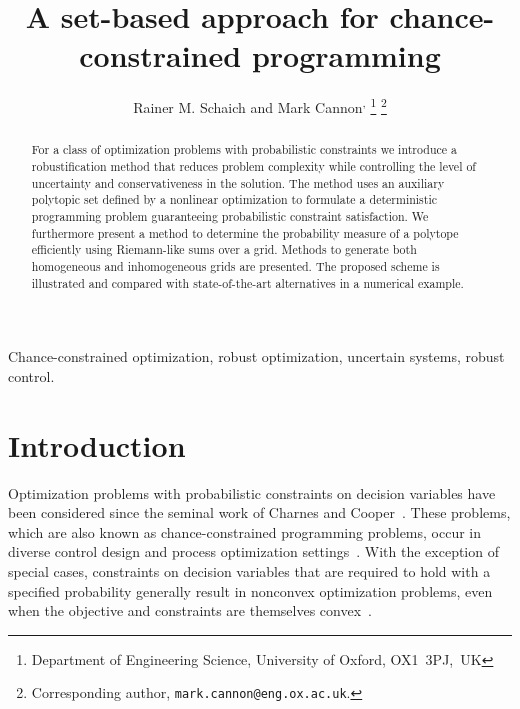 \documentclass[letterpaper, 10pt, conference]{ieeeconf} %
\begin{document}
\title{A set-based approach for chance-constrained programming}

\author{Rainer M. Schaich\textsuperscript{\dag} %
         and Mark Cannon\textsuperscript{\dag,\ddag}%
\thanks{\textsuperscript{\dag}Department of Engineering Science, University of Oxford, OX1~3PJ,~UK}%
\thanks{\textsuperscript{\ddag}Corresponding author, 
        \texttt{mark.cannon@eng.ox.ac.uk}.}
}
\newcommand{\note}[1]{\todo[inline]{#1}}

\maketitle

\begin{abstract} 
For a class of optimization problems with probabilistic constraints we introduce a robustification method that reduces problem complexity while controlling the level of uncertainty and conservativeness in the solution. The method uses an auxiliary polytopic set defined by a nonlinear optimization to formulate a deterministic programming problem guaranteeing probabilistic constraint satisfaction. We furthermore present a method to determine the probability measure of a polytope efficiently using Riemann-like sums over a grid. Methods to generate both homogeneous and inhomogeneous grids are presented. The proposed scheme is illustrated and compared with state-of-the-art alternatives in a numerical example.
\end{abstract}

\begin{keywords}
Chance-constrained optimization, robust optimization, uncertain systems, robust control.
\end{keywords}

\section{Introduction}\label{sec:intro}%
%
%
%
%
%
\noindent
Optimization problems with probabilistic constraints on decision variables have been considered since the seminal work of Charnes and Cooper~\cite{charnes59,charnes63}. These problems, which are also known as chance-constrained programming problems, occur in diverse control design and process optimization settings~\cite{polyak01,fujisaki03,wendt02,ma12,tempo05,kouvaritakis06,lejeune07,henrion03,murr00}. 
%
With the exception of special cases, constraints on decision variables that are required to hold with a specified probability generally result in nonconvex optimization problems, even when the objective and constraints are themselves convex~\cite{prekopa95}.
%
\end{document}
